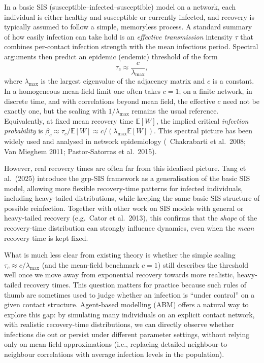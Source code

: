 \documentclass[11pt,a4paper]{article}
\begin{document}
In a basic SIS (susceptible--infected--susceptible) model on a network, each individual is either healthy and susceptible or currently infected, and recovery is typically assumed to follow a simple, memoryless process. A standard summary of how easily infection can take hold is an \emph{effective transmission} intensity $\tau$ that combines per-contact infection strength with the mean infectious period. Spectral arguments then predict an epidemic (endemic) threshold of the form
\[
  \tau_c \approx \frac{c}{\lambda_{\max}},
\]
where $\lambda_{\max}$ is the largest eigenvalue of the adjacency matrix and $c$ is a constant. In a homogeneous mean-field limit one often takes $c=1$; on a finite network, in discrete time, and with correlations beyond mean field, the effective $c$ need not be exactly one, but the scaling with $1/\lambda_{\max}$ remains the usual reference. Equivalently, at fixed mean recovery time $\mathbb{E}[W]$, the implied critical \emph{infection probability} is $\beta_c \approx \tau_c/\mathbb{E}[W] \approx c/(\lambda_{\max}\mathbb{E}[W])$. This spectral picture has been widely used and analysed in network epidemiology (\ Chakrabarti et al.\ 2008; Van Mieghem 2011; Pastor-Satorras et al.\ 2015).

However, real recovery times are often far from this idealised picture. Tang et al.\ (2025) introduce the grp-SIS framework as a generalisation of the basic SIS model, allowing more flexible recovery-time patterns for infected individuals, including heavy-tailed distributions, while keeping the same basic SIS structure of possible reinfection. Together with other work on SIS models with general or heavy-tailed recovery (e.g.\ Cator et al.\ 2013), this confirms that the \emph{shape} of the recovery-time distribution can strongly influence dynamics, even when the \emph{mean} recovery time is kept fixed.

What is much less clear from existing theory is whether the simple scaling $\tau_c \approx c/\lambda_{\max}$ (and the mean-field benchmark $c=1$) still describes the threshold well once we move away from exponential recovery towards more realistic, heavy-tailed recovery times. This question matters for practice because such rules of thumb are sometimes used to judge whether an infection is ``under control'' on a given contact structure. Agent-based modelling (ABM) offers a natural way to explore this gap: by simulating many individuals on an explicit contact network, with realistic recovery-time distributions, we can directly observe whether infections die out or persist under different parameter settings, without relying only on mean-field approximations (i.e., replacing detailed neighbour-to-neighbour correlations with average infection levels in the population).
\end{document}
